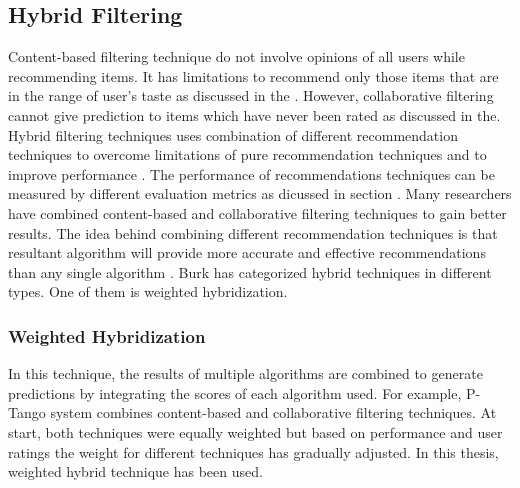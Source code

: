 \subsection{Hybrid Filtering}
Content-based filtering technique do not involve opinions of all users while recommending items. It has limitations to recommend only those items that are in the range of user's taste as discussed in the . However, collaborative filtering cannot give prediction to items which have never been rated as discussed in the. Hybrid filtering techniques uses combination of different recommendation techniques to overcome limitations of pure recommendation techniques and to improve performance \cite{37,38}. The performance of recommendations techniques can be measured by different evaluation metrics as dicussed in section . Many researchers have combined content-based and collaborative filtering techniques to gain better results. The idea behind combining different recommendation techniques is that resultant algorithm will provide more accurate and effective recommendations than any single algorithm \cite{39}. Burk \cite{40} has categorized hybrid techniques in different types. One of them is weighted hybridization.\\

\subsubsection{Weighted Hybridization}
In this technique, the results of multiple algorithms are combined to generate predictions by integrating the scores of each algorithm used. For example, \cite{41} P-Tango system combines content-based and collaborative filtering techniques. At start, both techniques were equally weighted but based on performance and user ratings the weight for different techniques has gradually adjusted. In this thesis, weighted hybrid technique has been used.



